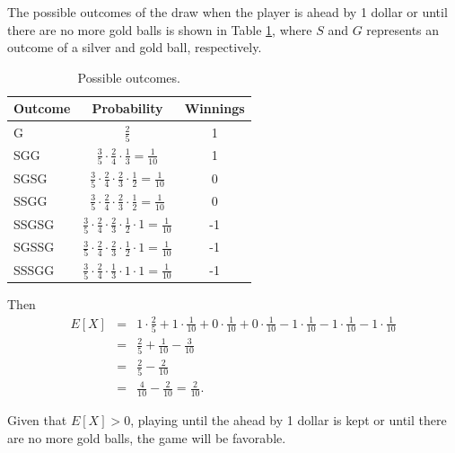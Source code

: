 \documentclass[12pt]{article}
\begin{document}
	The possible outcomes of the draw when the player is ahead by 1 dollar or until there are no more gold balls is shown in Table \ref{table_outcomes}, where $S$ and $G$ represents an outcome of a silver and gold ball, respectively.
	\begin{table}
		\caption{Possible outcomes.}
		\label{table_outcomes}
		\centering
		\begin{tabular}{lcc}
			\hline
			\bf Outcome & \bf Probability & \bf Winnings \\
			\hline
			\vspace{0.2cm}
			G & $\frac{2}{5}$ & 1 \\
			\vspace{0.2cm}
			SGG & $\frac{3}{5} \cdot \frac{2}{4} \cdot \frac{1}{3} = \frac{1}{10}$ & 1 \\
			\vspace{0.2cm}
			SGSG & $\frac{3}{5} \cdot \frac{2}{4} \cdot \frac{2}{3} \cdot \frac{1}{2} = \frac{1}{10}$ & 0 \\
			\vspace{0.2cm}
			SSGG & $\frac{3}{5} \cdot \frac{2}{4} \cdot \frac{2}{3} \cdot \frac{1}{2} = \frac{1}{10}$ & 0 \\
			\vspace{0.2cm}
			SSGSG & $\frac{3}{5} \cdot \frac{2}{4} \cdot \frac{2}{3} \cdot \frac{1}{2} \cdot 1 = \frac{1}{10}$ & -1 \\
			\vspace{0.2cm}
			SGSSG & $\frac{3}{5} \cdot \frac{2}{4} \cdot \frac{2}{3} \cdot \frac{1}{2} \cdot 1 = \frac{1}{10}$ & -1 \\
			\vspace{0.2cm}
			SSSGG & $\frac{3}{5} \cdot \frac{2}{4} \cdot \frac{1}{3} \cdot 1 \cdot 1 = \frac{1}{10}$ & -1 \\
			\hline
		\end{tabular}
	\end{table}

	Then 
	\begin{eqnarray*}
	E[X] &=& 1 \cdot \frac{2}{5} + 1 \cdot \frac{1}{10} + 0 \cdot \frac{1}{10} + 0 \cdot \frac{1}{10} - 1 \cdot \frac{1}{10} - 1 \cdot \frac{1}{10} - 1\cdot \frac{1}{10} \\
	&=& \frac{2}{5} + \frac{1}{10} - \frac{3}{10} \\
	&=& \frac{2}{5} - \frac{2}{10} \\
	&=& \frac{4}{10} - \frac{2}{10} = \frac{2}{10}.
	\end{eqnarray*}

	Given that $E[X] > 0$, playing until the ahead by 1 dollar is kept or until there are no more gold balls, the game will be favorable. 
	
\end{document}
